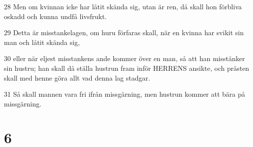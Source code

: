 \par 28 Men om kvinnan icke har låtit skända sig, utan är ren, då skall hon förbliva oskadd och kunna undfå livsfrukt.
\par 29 Detta är misstankelagen, om huru förfaras skall, när en kvinna har svikit sin man och låtit skända sig,
\par 30 eller när eljest misstankens ande kommer över en man, så att han misstänker sin hustru; han skall då ställa hustrun fram inför HERRENS ansikte, och prästen skall med henne göra allt vad denna lag stadgar.
\par 31 Så skall mannen vara fri ifrån missgärning, men hustrun kommer att bära på missgärning.

\chapter{6}

